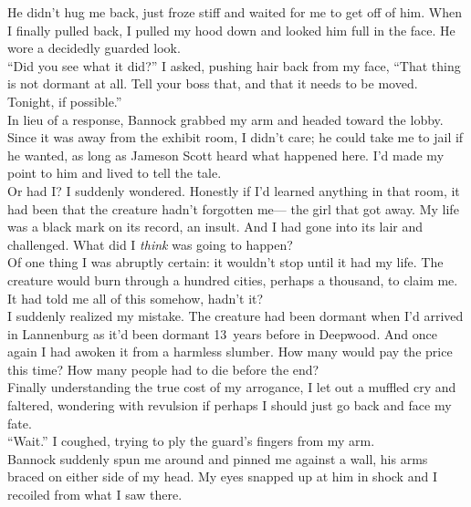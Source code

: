 \documentclass[a5paper]{scrartcl}
\begin{document}
He didn't hug me back, just froze stiff and waited for me to get off of him. When I finally pulled back, I pulled my hood down and looked him full in the face. He wore a decidedly guarded look.   \\


\enquote{Did you see what it did?} I asked, pushing hair back from my face, \enquote{That thing is not dormant at all. Tell your boss that, and that it needs to be moved. Tonight, if possible.}\\


In lieu of a response, Bannock grabbed my arm and headed toward the lobby. Since it was away from the exhibit room, I didn't care; he could take me to jail if he wanted, as long as Jameson Scott heard what happened here. I'd made my point to him and lived to tell the tale. \\


Or had I? I suddenly wondered.  Honestly if I'd learned anything in that room, it had been that the creature hadn't forgotten me--- the girl that got away. My life was a black mark on its record, an insult.  And I had gone into its lair and challenged. What did I \textit{think}
 was going to happen?\\


Of one thing I was abruptly certain: it wouldn't stop until it had my life. The creature would burn through a hundred cities, perhaps a thousand, to claim me. It had told me all of this somehow, hadn't it?\\


I suddenly realized my mistake. The creature had been dormant when I'd arrived in Lannenburg as it'd been dormant 13~years before in Deepwood. And once again I had awoken it from a harmless slumber. How many would pay the price this time?   How many people had to die before the end? \\


Finally understanding the true cost of my arrogance, I let out a muffled cry and faltered, wondering with revulsion if perhaps I should just go back and face my fate. \\


\enquote{Wait.} I coughed, trying to ply the guard's fingers from my arm.\\


Bannock suddenly spun me around and pinned me against a wall, his arms braced on either side of my head. My eyes snapped up at him in shock and I recoiled from what I saw there.\\
\end{document}
